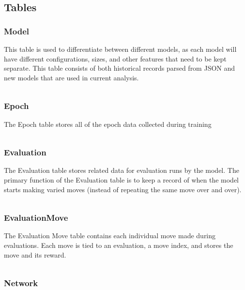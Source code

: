 \documentclass[12pt]{article}
\begin{document}
\subsection{Tables}

\subsubsection{Model}

This table is used to differentiate between different models, as each model will have different configurations, sizes, and other features that need to be kept separate. This table consists of both historical records parsed from JSON and new models that are used in current analysis.

\inputminted{SQL}{../../sql/tables/model.sql}

\subsubsection{Epoch}

The Epoch table stores all of the epoch data collected during training

\inputminted{SQL}{../../sql/tables/epoch.sql}

\subsubsection{Evaluation}

The Evaluation table stores related data for evaluation runs by the model. The primary function of the Evaluation table is to keep a record of when the model starts making varied moves (instead of repeating the same move over and over).

\inputminted{SQL}{../../sql/tables/evaluation.sql}

\subsubsection{EvaluationMove}

The Evaluation Move table contains each individual move made during evaluations. Each move is tied to an evaluation, a move index, and stores the move and its reward.

\inputminted{SQL}{../../sql/tables/evaluationmove.sql}

\subsubsection{Network}
\end{document}
